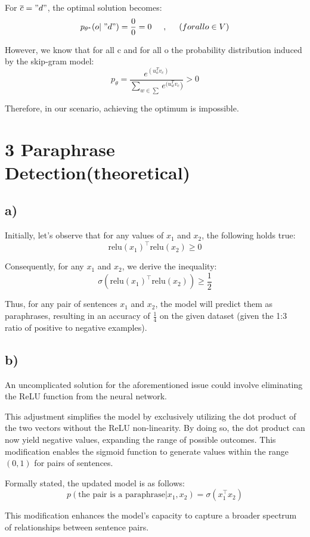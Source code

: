 \documentclass{article}
\begin{document}
For $\overline{c} = "d"$, the optimal solution becomes:
\[
p_{\theta^{*}}(o| \hspace{0.1cm}"d") = \frac{0}{0} = 0 \hspace{0.5cm},\hspace{0.5cm}( for all o\in V)
\]

However, we know that for all c and for all o the probability distribution induced by the skip-gram model:
\[
p_{\theta} = \frac{e^{(u_o^T v_c)}}{\sum_{w \in \sum} e^{(u_w^T v_c})} > 0
\]

Therefore, in our scenario, achieving the optimum is impossible.
\clearpage
\section*{3 Paraphrase Detection(theoretical)}

\subsection*{a)}
Initially, let's observe that for any values of \(x_1\) and \(x_2\), the following holds true:
   \[\text{relu}(x_1)^\top \text{relu}(x_2) \geq 0\]

Consequently, for any \(x_1\) and \(x_2\), we derive the inequality:
   \[\sigma(\text{relu}(x_1)^\top \text{relu}(x_2)) \geq \frac{1}{2}\]

Thus, for any pair of sentences \(x_1\) and \(x_2\), the model will predict them as paraphrases, resulting in an accuracy of \(\frac{1}{4}\) on the given dataset (given the 1:3 ratio of positive to negative examples).

\subsection*{b)}
An uncomplicated solution for the aforementioned issue could involve eliminating the ReLU function from the neural network.

This adjustment simplifies the model by exclusively utilizing the dot product of the two vectors without the ReLU non-linearity. By doing so, the dot product can now yield negative values, expanding the range of possible outcomes. This modification enables the sigmoid function to generate values within the range \((0,1)\) for pairs of sentences.

Formally stated, the updated model is as follows:
\[ p(\text{the pair is a paraphrase} | x_1, x_2) = \sigma(x_1^\top x_2) \]

This modification enhances the model's capacity to capture a broader spectrum of relationships between sentence pairs.
\end{document}
